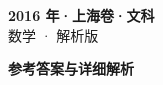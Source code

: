 \documentclass[zihao=-4, a4paper]{ctexart}
\begin{document}
\begin{center}
  {\Large\bfseries 2016 年·上海卷·文科}\\[4pt]
  {\large 数学 · 解析版}
\end{center}
\medskip
{}

\clearpage
{}
\begin{center}{\Large\bfseries 参考答案与详细解析}\end{center}
\medskip

\end{document}
